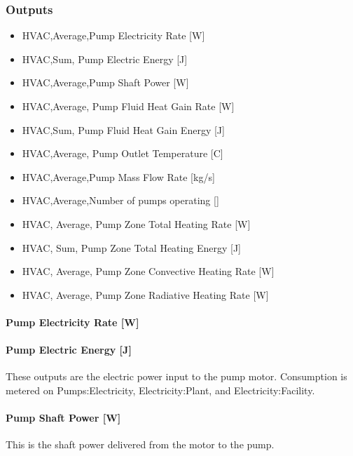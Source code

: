 \subsubsection{Outputs}\label{outputs-4-011}

\begin{itemize}
\item
  HVAC,Average,Pump Electricity Rate {[}W{]}
\item
  HVAC,Sum, Pump Electric Energy {[}J{]}
\item
  HVAC,Average,Pump Shaft Power {[}W{]}
\item
  HVAC,Average, Pump Fluid Heat Gain Rate {[}W{]}
\item
  HVAC,Sum, Pump Fluid Heat Gain Energy {[}J{]}
\item
  HVAC,Average, Pump Outlet Temperature {[}C{]}
\item
  HVAC,Average,Pump Mass Flow Rate {[}kg/s{]}
\item
  HVAC,Average,Number of pumps operating {[]}
\item
  HVAC, Average, Pump Zone Total Heating Rate {[}W{]}
\item
  HVAC, Sum, Pump Zone Total Heating Energy {[}J{]}
\item
  HVAC, Average, Pump Zone Convective Heating Rate {[}W{]}
\item
  HVAC, Average, Pump Zone Radiative Heating Rate {[}W{]}
\end{itemize}

\paragraph{Pump Electricity Rate {[}W{]}}\label{pump-electric-power-w-4}

\paragraph{Pump Electric Energy {[}J{]}}\label{pump-electric-energy-j-4}

These outputs are the electric power input to the pump motor. Consumption is metered on Pumps:Electricity, Electricity:Plant, and Electricity:Facility.

\paragraph{Pump Shaft Power {[}W{]}}\label{pump-shaft-power-w-4}

This is the shaft power delivered from the motor to the pump.

